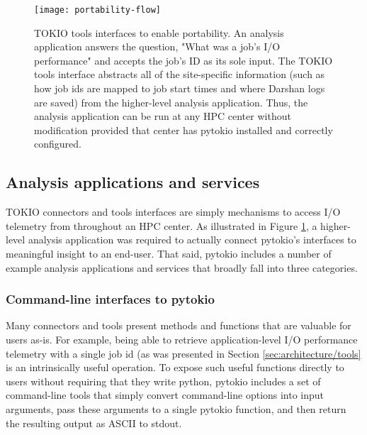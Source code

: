 \begin{figure}
    \centering
    \texttt{[image: portability-flow]}
    \caption{TOKIO tools interfaces to enable portability.
    An analysis application answers the question, "What was a job's I/O performance" and accepts the job's ID as its sole input.
    The TOKIO tools interface abstracts all of the site-specific information (such as how job ids are mapped to job start times and where Darshan logs are saved) from the higher-level analysis application.
    Thus, the analysis application can be run at any HPC center without modification provided that center has pytokio installed and correctly configured.
    }
    \label{fig:portability-flow}
    \vspace{-.2in}
\end{figure}

\subsection{Analysis applications and services} \label{sec:architecture/analysis}


TOKIO connectors and tools interfaces are simply mechanisms to access I/O telemetry from throughout an HPC center.
As illustrated in Figure \ref{fig:portability-flow}, a higher-level analysis application was required to actually connect pytokio's interfaces to meaningful insight to an end-user.
That said, pytokio includes a number of example analysis applications and services that broadly fall into three categories.

\subsubsection{Command-line interfaces to pytokio}

Many connectors and tools present methods and functions that are valuable for users as-is.
For example, being able to retrieve application-level I/O performance telemetry with a single job id (as was presented in Section \ref{sec:architecture/tools} is an intrinsically useful operation.
To expose such useful functions directly to users without requiring that they write python, pytokio includes a set of command-line tools that simply convert command-line options into input arguments, pass these arguments to a single pytokio function, and then return the resulting output as ASCII to stdout.


